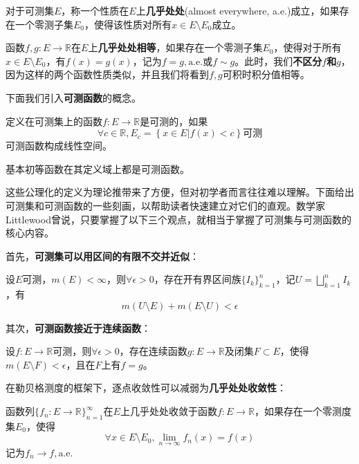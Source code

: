 \documentclass{ctexbook}
\begin{document}
\begin{definition}[几乎处处]
    对于可测集$E$，称一个性质在$E$上\textbf{几乎处处}(almost everywhere, a.e.)成立，如果存在一个零测子集$E_0$，使得该性质对所有$x\in E\setminus E_0$成立。
\end{definition}

\begin{example}[几乎处处相等]
    函数$f,g:E\to\mathbb{R}$在$E$上\textbf{几乎处处相等}，如果存在一个零测子集$E_0$，使得对于所有$x\in E\setminus E_0$，有$f(x)=g(x)$，记为$f=g,\text{a.e.}$或$f\sim g$。此时，我们\textbf{不区分$f$和$g$}，因为这样的两个函数性质类似，并且我们将看到$f,g$可积时积分值相等。
\end{example}

下面我们引入\textbf{可测函数}的概念。

\begin{definition}[可测函数]
    定义在可测集上的函数$f:E\to\mathbb{R}$是可测的，如果
    $$\forall c\in\mathbb{R},E_c=\left\{x\in E\left| f(x)<c\right.\right\}\text{可测}$$
    可测函数构成线性空间。
\end{definition}
\begin{example}
    基本初等函数在其定义域上都是可测函数。
\end{example}

这些公理化的定义为理论推带来了方便，但对初学者而言往往难以理解。下面给出可测集和可测函数的一些刻画，以帮助读者快速建立对它们的直观。数学家Littlewood曾说\cite{real_analysis}，只要掌握了以下三个观点，就相当于掌握了可测集与可测函数的核心内容。

首先，\textbf{可测集可以用区间的有限不交并近似}：

\begin{theorem}
    设$E$可测，$m(E)<\infty$，则$\forall \epsilon>0$，存在开有界区间族$\{I_k\}_{k=1}^{n}$，记$U=\bigsqcup_{k=1}^{n} I_k$，有
    \[m(U\setminus E)+m(E\setminus U)<\epsilon\]
\end{theorem}

其次，\textbf{可测函数接近于连续函数}：

\begin{theorem}[Lusin定理]
    设$f:E\to\mathbb{R}$可测，则$\forall \epsilon>0$，存在连续函数$g:E\to\mathbb{R}$及闭集$F\subset E$，使得$m(E\setminus F)<\epsilon$，且在$F$上有$f=g$。
\end{theorem}

在勒贝格测度的框架下，逐点收敛性可以减弱为\textbf{几乎处处收敛性}：

\begin{definition}[几乎处处收敛]
    函数列$\{f_n:E\to\mathbb{R}\}_{n=1}^{\infty}$在$E$上几乎处处收敛于函数$f:E\to\mathbb{R}$，如果存在一个零测度集$E_0$，使得
    $$\forall x\in E\setminus E_0,\lim_{n\to\infty}f_n(x)=f(x)$$
    记为$f_n\to f,\text{a.e.}$
\end{definition}
\end{document}
